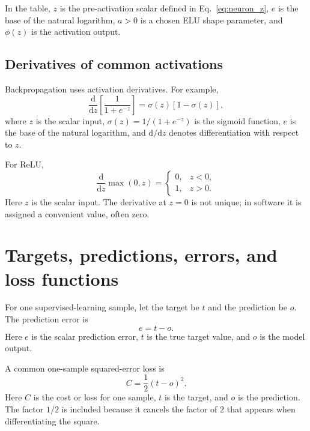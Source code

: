 \documentclass[11pt]{article}
\newcommand{\dd}{\mathrm{d}}
\begin{document}
In the table, $z$ is the pre-activation scalar defined in Eq.~\eqref{eq:neuron_z}, $e$ is the base of the natural logarithm, $a>0$ is a chosen ELU shape parameter, and $\phi(z)$ is the activation output.

\subsection{Derivatives of common activations}

Backpropagation uses activation derivatives.  For example,
\begin{equation}
    \frac{\dd}{\dd z}\left[\frac{1}{1+e^{-z}}\right]
    = \sigma(z)\left[1-\sigma(z)\right],
    \label{eq:sigmoid_derivative}
\end{equation}
where $z$ is the scalar input, $\sigma(z)=1/(1+e^{-z})$ is the sigmoid function, $e$ is the base of the natural logarithm, and $\dd/\dd z$ denotes differentiation with respect to $z$.

For ReLU,
\begin{equation}
    \frac{\dd}{\dd z}\max(0,z)=
    \begin{cases}
    0, & z<0,\\
    1, & z>0.
    \end{cases}
    \label{eq:relu_derivative}
\end{equation}
Here $z$ is the scalar input.  The derivative at $z=0$ is not unique; in software it is assigned a convenient value, often zero.

\section{Targets, predictions, errors, and loss functions}

For one supervised-learning sample, let the target be $t$ and the prediction be $o$.  The prediction error is
\begin{equation}
    e = t-o.
    \label{eq:error_one}
\end{equation}
Here $e$ is the scalar prediction error, $t$ is the true target value, and $o$ is the model output.

A common one-sample squared-error loss is
\begin{equation}
    C = \frac{1}{2}(t-o)^2.
    \label{eq:single_loss}
\end{equation}
Here $C$ is the cost or loss for one sample, $t$ is the target, and $o$ is the prediction.  The factor $1/2$ is included because it cancels the factor of $2$ that appears when differentiating the square.
\end{document}
